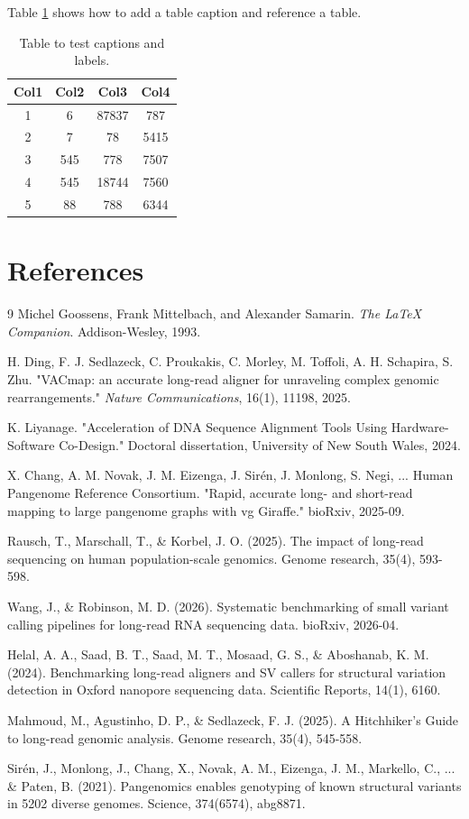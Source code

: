 \documentclass[12pt, letterpaper]{article}
\begin{document}
Table \ref{table:data} shows how to add a table caption and reference a table.
\begin{table}[h!]
\centering
\begin{tabular}{cccc}
 \toprule
 Col1 & Col2 & Col3 & Col4 \\
 \midrule
 1 & 6 & 87837 & 787 \\
 2 & 7 & 78 & 5415 \\
 3 & 545 & 778 & 7507 \\
 4 & 545 & 18744 & 7560 \\
 5 & 88 & 788 & 6344 \\
 \bottomrule
\end{tabular}
\caption{Table to test captions and labels.}
\label{table:data}
\end{table}

\section*{References}
\begin{thebibliography}{9}
Michel Goossens, Frank Mittelbach, and Alexander Samarin.
\textit{The \LaTeX{} Companion}.
Addison-Wesley, 1993.

H. Ding, F. J. Sedlazeck, C. Proukakis, C. Morley, M. Toffoli, A. H. Schapira, S. Zhu.
"VACmap: an accurate long-read aligner for unraveling complex genomic rearrangements." \textit{Nature Communications}, 16(1), 11198, 2025.

K. Liyanage.
"Acceleration of DNA Sequence Alignment Tools Using Hardware-Software Co-Design." Doctoral dissertation, University of New South Wales, 2024.

X. Chang, A. M. Novak, J. M. Eizenga, J. Sir\'en, J. Monlong, S. Negi, ... Human Pangenome Reference Consortium.
"Rapid, accurate long- and short-read mapping to large pangenome graphs with vg Giraffe." bioRxiv, 2025-09.

Rausch, T., Marschall, T., \& Korbel, J. O. (2025). The impact of long-read sequencing on human population-scale genomics. Genome research, 35(4), 593-598.

Wang, J., \& Robinson, M. D. (2026). Systematic benchmarking of small variant calling pipelines for long-read RNA sequencing data. bioRxiv, 2026-04.


Helal, A. A., Saad, B. T., Saad, M. T., Mosaad, G. S., \& Aboshanab, K. M. (2024). Benchmarking long-read aligners and SV callers for structural variation detection in Oxford nanopore sequencing data. Scientific Reports, 14(1), 6160.

Mahmoud, M., Agustinho, D. P., \& Sedlazeck, F. J. (2025). A Hitchhiker's Guide to long-read genomic analysis. Genome research, 35(4), 545-558.

Sirén, J., Monlong, J., Chang, X., Novak, A. M., Eizenga, J. M., Markello, C., ... & Paten, B. (2021). Pangenomics enables genotyping of known structural variants in 5202 diverse genomes. Science, 374(6574), abg8871.

\end{thebibliography}
\end{document}
